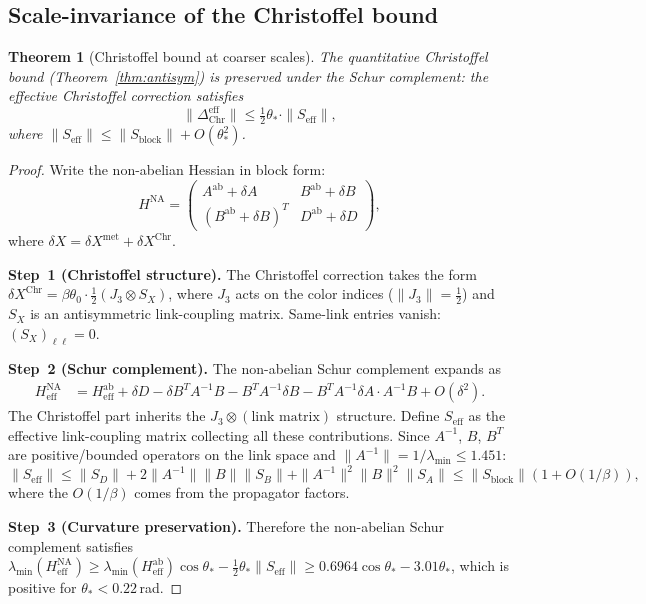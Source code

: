 \documentclass[11pt]{article}
\newtheorem{theorem}{Theorem}[section]
\theoremstyle{definition}
\begin{document}
\subsection{Scale-invariance of the Christoffel bound}

\begin{theorem}[Christoffel bound at coarser scales]\label{thm:antisym-scale}
The quantitative Christoffel bound (Theorem~\ref{thm:antisym}) is
preserved under the Schur complement: the effective Christoffel
correction satisfies
\begin{equation}
\|\Delta_{\mathrm{Chr}}^{\mathrm{eff}}\|
\le\tfrac{1}{2}\theta_*\cdot\|S_{\mathrm{eff}}\|,
\end{equation}
where $\|S_{\mathrm{eff}}\|\le\|S_{\mathrm{block}}\|+O(\theta_*^2)$.
\end{theorem}

\begin{proof}
Write the non-abelian Hessian in block form:
\[
H^{\mathrm{NA}}=\begin{pmatrix}
A^{\mathrm{ab}}+\delta A & B^{\mathrm{ab}}+\delta B\\
(B^{\mathrm{ab}}+\delta B)^T & D^{\mathrm{ab}}+\delta D
\end{pmatrix},
\]
where $\delta X=\delta X^{\mathrm{met}}+\delta X^{\mathrm{Chr}}$.

\medskip\noindent\textbf{Step~1 (Christoffel structure).}
The Christoffel correction takes the form
$\delta X^{\mathrm{Chr}}=\beta\theta_0\cdot\frac{1}{2}
(J_3\otimes S_X)$,
where $J_3$ acts on the color indices ($\|J_3\|=\frac{1}{2}$) and
$S_X$ is an antisymmetric link-coupling matrix.  Same-link
entries vanish: $(S_X)_{\ell\ell}=0$.

\medskip\noindent\textbf{Step~2 (Schur complement).}
The non-abelian Schur complement expands as
\begin{align}
H_{\mathrm{eff}}^{\mathrm{NA}}
&=H_{\mathrm{eff}}^{\mathrm{ab}}
+\delta D-\delta B^T A^{-1}B-B^T A^{-1}\delta B
-B^T A^{-1}\delta A\cdot A^{-1}B+O(\delta^2).
\end{align}
The Christoffel part inherits the $J_3\otimes(\text{link matrix})$
structure.  Define $S_{\mathrm{eff}}$ as the effective link-coupling
matrix collecting all these contributions.  Since $A^{-1}$, $B$, $B^T$
are positive/bounded operators on the link space and
$\|A^{-1}\|=1/\lambda_{\min}\le 1.451$:
\[
\|S_{\mathrm{eff}}\|\le\|S_D\|+2\|A^{-1}\|\|B\|\|S_B\|
+\|A^{-1}\|^2\|B\|^2\|S_A\|\le\|S_{\mathrm{block}}\|(1+O(1/\beta)),
\]
where the $O(1/\beta)$ comes from the propagator factors.

\medskip\noindent\textbf{Step~3 (Curvature preservation).}
Therefore the non-abelian Schur complement satisfies
$\lambda_{\min}(H_{\mathrm{eff}}^{\mathrm{NA}})
\ge\lambda_{\min}(H_{\mathrm{eff}}^{\mathrm{ab}})\cos\theta_*
-\frac{1}{2}\theta_*\|S_{\mathrm{eff}}\|
\ge 0.6964\cos\theta_*-3.01\theta_*$,
which is positive for $\theta_*<0.22$\,rad.
\end{proof}
\end{document}
